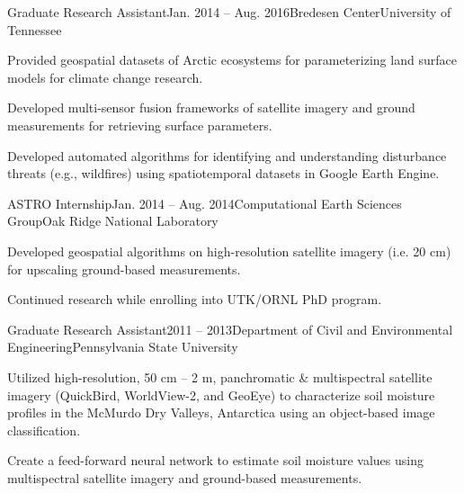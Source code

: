 \documentclass{tidycv} %
\begin{document}
\pagebreak

\begin{cvresearches}

\begin{cvresearch}{Graduate Research Assistant}{Jan. 2014 -- Aug. 2016}{Bredesen Center}{University of Tennessee}
 \item Provided geospatial datasets of Arctic ecosystems for parameterizing land surface models for climate change research.
 \item  Developed multi-sensor fusion frameworks of satellite imagery and ground measurements for retrieving surface parameters.
 \item  Developed automated algorithms for identifying and understanding disturbance threats
(e.g., wildfires) using spatiotemporal datasets in Google Earth Engine.
\end{cvresearch}

\begin{cvresearch}{ASTRO Internship}{Jan. 2014 -- Aug. 2014}{Computational Earth Sciences Group}{Oak Ridge National Laboratory}
 \item Developed geospatial algorithms on high-resolution satellite imagery (i.e. 20 cm) for upscaling ground-based measurements.
 \item Continued research while enrolling into UTK/ORNL PhD program.
\end{cvresearch}

\begin{cvresearch}{Graduate Research Assistant}{2011 -- 2013}{Department of Civil and Environmental Engineering}{Pennsylvania State University}
 \item Utilized high-resolution, 50 cm -- 2 m, panchromatic \& multispectral satellite imagery
(QuickBird, WorldView-2, and GeoEye) to characterize soil moisture profiles in the McMurdo Dry Valleys, Antarctica using an object-based image classification. 
 \item Create a feed-forward neural network to estimate soil moisture values using multispectral satellite imagery and ground-based measurements.
\end{cvresearch}


\end{cvresearches}
\end{document}
